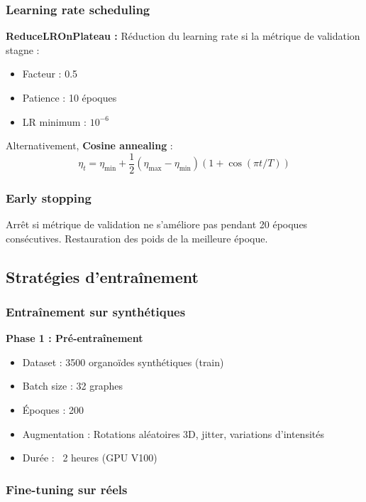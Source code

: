\subsubsection{Learning rate scheduling}

\textbf{ReduceLROnPlateau :}
Réduction du learning rate si la métrique de validation stagne :
\begin{itemize}
    \item Facteur : 0.5
    \item Patience : 10 époques
    \item LR minimum : $10^{-6}$
\end{itemize}

Alternativement, \textbf{Cosine annealing} :
\[
\eta_t = \eta_{\min} + \frac{1}{2}(\eta_{\max} - \eta_{\min})(1 + \cos(\pi t / T))
\]

\subsubsection{Early stopping}

Arrêt si métrique de validation ne s'améliore pas pendant 20 époques consécutives. Restauration des poids de la meilleure époque.

\subsection{Stratégies d'entraînement}

\subsubsection{Entraînement sur synthétiques}

\textbf{Phase 1 : Pré-entraînement}
\begin{itemize}
    \item Dataset : 3500 organoïdes synthétiques (train)
    \item Batch size : 32 graphes
    \item Époques : 200
    \item Augmentation : Rotations aléatoires 3D, jitter, variations d'intensités
    \item Durée : ~2 heures (GPU V100)
\end{itemize}

\subsubsection{Fine-tuning sur réels}

